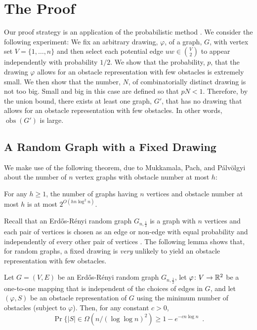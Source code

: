 \documentclass{patmorin}
\DeclareMathOperator{\obs}{obs}
\renewcommand{\note}[1]{}
\begin{document}
\section{The Proof}

Our proof strategy is an application of the probabilistic method
\cite{alon.spencer:probabilistic}.  We consider the following
experiment: We fix an arbitrary drawing, $\varphi$, of a graph, $G$,
with vertex set $V=\{1,\ldots,n\}$ and then select each potential edge
$uw\in\binom{V}{2}$ to appear independently with probability $1/2$.
We show that the probability, $p$, that the drawing $\varphi$ allows
for an obstacle representation with few obstacles is extremely small.
We then show that the number, $N$, of combinatorially distinct drawing is
not too big.  Small and big in this case are defined so that $pN < 1$.
Therefore, by the union bound, there exists at least one graph, $G'$,
that has no drawing that allows for an obstacle representation with
few obstacles.  In other words, $\obs(G')$ is large.

\subsection{A Random Graph with a Fixed Drawing}

We make use of the following theorem, due to Mukkamala, Pach, and
P\'alv\"olgyi \cite[Theorem~1]{mukkamala.pach.ea:lower} about the number
of $n$ vertex graphs with obstacle number at most $h$:\note{We do need $h\ge 1$. With $h=0$, the upper bound is $O(1)$, but there are $n+1$ graphs with
\textbf{at most} $n$ vertices and obstacle number 0.}
\begin{thm}
  For any $h\ge 1$, the number of graphs having $n$ vertices and
  obstacle number at most $h$ is at most $2^{O(hn\log^2 n)}$.
\end{thm}

Recall that an Erd\H{o}s-R\'enyi random graph $G_{n,\frac{1}{2}}$ is a
graph with $n$ vertices and each pair of vertices is chosen as an edge
or non-edge with equal probability and independently of every other pair
of vertices \cite{erdos.renyi:random}.  The following lemma shows that,
for random graphs, a fixed drawing is \emph{very} unlikely to yield
an obstacle representation with few obstacles.


\begin{lem}
  Let $G=(V,E)$ be an Erd\H{o}s-R\'enyi random graph $G_{n,\frac{1}{2}}$,
  let $\varphi\colon V\to \mathbb{R}^2$ be a one-to-one mapping that is
  independent of the choices of edges in $G$, and let $(\varphi, S)$ be
  an obstacle representation of $G$ using the minimum number of obstacles
  (subject to $\varphi$).  Then, for any constant $c>0$,
  \[
     \Pr\{|S| \in \Omega(n/(\log\log n)^2) \ge 1-e^{-cn\log n}  \enspace .
  \] 
  \note{Note to Pat: Come back and look at this $c$ again.}
\end{lem}
\end{document}
